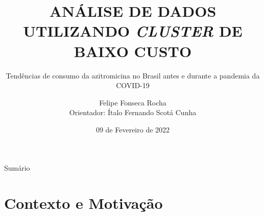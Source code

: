 \documentclass[10pt,brazil]{beamer}
\theoremstyle{definition}
\begin{document}

\title[]{ANÁLISE DE DADOS UTILIZANDO \emph{CLUSTER} DE BAIXO CUSTO}
\subtitle{Tendências de consumo da
azitromicina no Brasil antes e durante a
pandemia da COVID-19}


\author[Felipe Rocha]{Felipe Fonseca Rocha \\
  \vspace{0.25cm}
  Orientador: Ítalo Fernando Scotá Cunha}
\date{09 de Fevereiro de 2022}

\AtBeginSubsection{%
  \begin{frame}
    \tableofcontents[currentsection=show,sectionstyle=show/shaded,subsectionstyle=show/shaded/hide]
  \end{frame}
}
\frame{\maketitle}


\begin{frame}{Sumário}
  \tableofcontents[hideallsubsections]
\end{frame}


%
%

\section{Contexto e Motivação}
\end{document}
